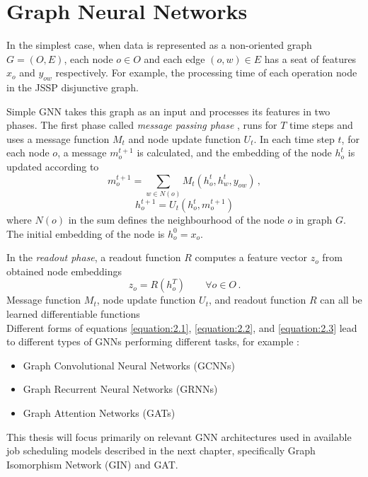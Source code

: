\section{Graph Neural Networks}

In the simplest case, when data is represented as a non-oriented graph $G = (O, E)$, each node $o \in O$ and each edge $(o, w) \in E$ has a seat of features $x_o$ and $y_{ow}$ respectively. For example, the processing time of each operation node in the JSSP disjunctive graph. 
\par
Simple GNN takes this graph as an input and processes its features in two phases. The first phase called \textit{message passing phase} \cite{pmlr-v70-gilmer17a}, runs for $T$ time steps and uses a message function $M_t$ and node update function $U_t$. In each time step $t$, for each node $o$, a message $m_o^{t + 1}$ is calculated, and the embedding of the node $h_o^{t}$ is updated according to \cite{pmlr-v70-gilmer17a}
\begin{equation}\label{equation:2.1}
	m_o^{t + 1} = \sum_{w \in N(o)} M_t (h_o^t, h_w^t, y_{ow}) \, ,
\end{equation}
\begin{equation}\label{equation:2.2}
	h_o^{t+1} = U_t (h_o^t, m_o^{t+1})
\end{equation}
where $N(o)$ in the sum defines the neighbourhood of the node $o$ in graph $G$. The initial embedding of the node is $h_o^0 = x_o$.
\par
In the \textit{readout phase}, a readout function $R$ computes a feature vector $z_o$ from obtained node embeddings \cite{pmlr-v70-gilmer17a}
\begin{equation}\label{equation:2.3}
	z_o = R(h_o^T) \hspace{2em} \forall o \in O \, .
\end{equation}
Message function $M_t$, node update function $U_t$, and readout function $R$ can all be learned differentiable functions\\
Different forms of equations \ref{equation:2.1}, \ref{equation:2.2}, and \ref{equation:2.3} lead to different types of GNNs performing different tasks, for example \cite{10.1145/3495161, sanchez-lengeling2021a}:
\begin{itemize}
	\item Graph Convolutional Neural Networks (GCNNs)
	\item Graph Recurrent Neural Networks (GRNNs)
	\item Graph Attention Networks (GATs)
\end{itemize} 
This thesis will focus primarily on relevant GNN architectures used in available job scheduling models described in the next chapter, specifically Graph Isomorphism Network (GIN) and GAT.

